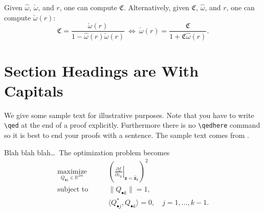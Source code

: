 \documentclass[graybox,footinfo]{svmult}
\newcommand{\homega}{\widehat{\omega}}
\newcommand{\wcomega}{\check{\omega}}
\newcommand{\fudge}{\mathfrak{C}}
\newcommand{\bsz}{\boldsymbol{z}}
\begin{document}
Given $\homega$, $\wcomega$, and $r$, one can compute $\fudge$.  Alternatively, given $\fudge$, $\homega$, and $r$, one can compute $\wcomega(r)$:
\[
\fudge = \frac{\wcomega(r)}{1 - \homega(r)\wcomega(r)} \ \iff \ \wcomega(r)= \frac{\fudge}{1+\fudge\homega(r)}.
\]














\section{Section Headings are With Capitals}\label{sec:1}

We give some sample text for illustrative purposes.
Note that you have to write \verb+\qed+ at the end of a proof explicitly.
Furthermore there is no \verb+\qedhere+ command so it is best to end your proofs with a sentence.
The sample text comes from \cite{ACN2013}.

Blah blah blah\ldots\ The optimization problem becomes
\begin{align}
 \underset{Q_{\bullet k}\in\mathbb{R}^{2m}}{\text{maximize}} \qquad& \left( \left.\frac{\partial f}{\partial z_k}\right|_{\bsz=\hat{\bsz}_k}\right)^2 \label{eq:optLT}\\
  \text{subject to} \qquad& \lVert Q_{\bullet k} \rVert=1, \nonumber\\
                    \qquad& \langle Q^*_{\bullet j},Q_{\bullet k} \rangle=0, \quad j=1,\ldots,k-1.\nonumber
\end{align}
\end{document}
